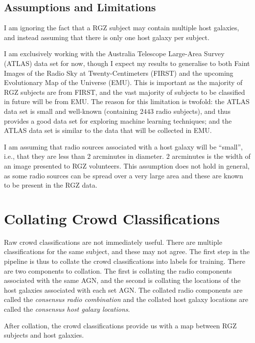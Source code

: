\documentclass[a4paper]{article}
\begin{document}
        \subsection{Assumptions and Limitations}

            I am ignoring the fact that a RGZ subject may contain multiple host galaxies, and instead assuming that there is only one host galaxy per subject.

            I am exclusively working with the Australia Telescope Large-Area Survey (ATLAS)\citep{norris06} data set for now, though I expect my results to generalise to both Faint Images of the Radio Sky at Twenty-Centimeters (FIRST)\citep{becker95} and the upcoming Evolutionary Map of the Universe (EMU)\citep{norris11}. This is important as the majority of RGZ subjects are from FIRST, and the vast majority of subjects to be classified in future will be from EMU. The reason for this limitation is twofold: the ATLAS data set is small and well-known (containing $2443$ radio subjects), and thus provides a good data set for exploring machine learning techniques; and the ATLAS data set is similar to the data that will be collected in EMU\cite{banfield15}.

            I am assuming that radio sources associated with a host galaxy will be ``small'', i.e., that they are less than $2$ arcminutes in diameter. $2$ arcminutes is the width of an image presented to RGZ volunteers. This assumption does not hold in general, as some radio sources can be spread over a very large area and these are known to be present in the RGZ data\citep{banfield16}.

    \section{Collating Crowd Classifications}

        Raw crowd classifications are not immediately useful. There are multiple classifications for the same subject, and these may not agree. The first step in the pipeline is thus to collate the crowd classifications into labels for training. There are two components to collation. The first is collating the radio components associated with the same AGN, and the second is collating the locations of the host galaxies associated with each set AGN. The collated radio components are called the \emph{consensus radio combination} and the collated host galaxy locations are called the \emph{consensus host galaxy locations}.

        After collation, the crowd classifications provide us with a map between RGZ subjects and host galaxies.
\end{document}
